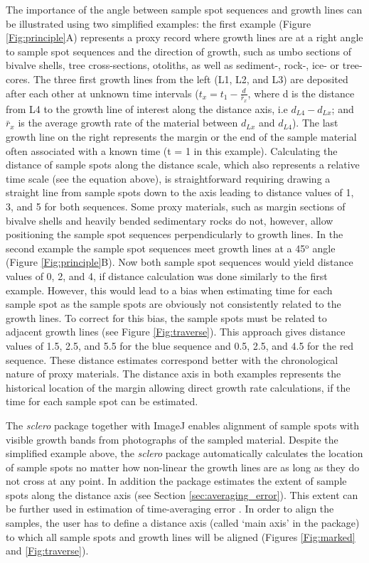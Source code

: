 \documentclass[11pt, a4paper]{article}
\newcommand{\sclero}{\textit{sclero}\xspace}
\begin{document}
The importance of the angle between sample spot sequences and growth lines can be illustrated using two simplified examples: the first example (Figure \ref{Fig:principle}A) represents a proxy record where growth lines are at a right angle to sample spot sequences and the direction of growth, such as umbo sections of bivalve shells, tree cross-sections, otoliths, as well as sediment-, rock-, ice- or tree-cores. The three first growth lines from the left (L1, L2, and L3) are deposited after each other at unknown time intervals ($t_{x} = t_{1} - \frac{d}{\bar{r}_{x}}$, where d is the distance from L4 to the growth line of interest along the distance axis, i.e $d_{L4} - d_{Lx}$; and $\bar{r}_{x}$ is the average growth rate of the material between $d_{Lx}$ and $d_{L4}$). The last growth line on the right represents the margin or the end of the sample material often associated with a known time (t = 1 in this example). Calculating the distance of sample spots along the distance scale, which also represents a relative time scale (see the equation above), is straightforward requiring drawing a straight line from sample spots down to the axis leading to distance values of 1, 3, and 5 for both sequences. Some proxy materials, such as margin sections of bivalve shells and heavily bended sedimentary rocks do not, however, allow positioning the sample spot sequences perpendicularly to growth lines. In the second example the sample spot sequences meet growth lines at a 45$^\mathrm{o}$ angle (Figure \ref{Fig:principle}B). Now both sample spot sequences would yield distance values of 0, 2, and 4, if distance calculation was done similarly to the first example. However, this would lead to a bias when estimating time for each sample spot as the sample spots are obviously not consistently related to the growth lines. To correct for this bias, the sample spots must be related to adjacent growth lines (see Figure \ref{Fig:traverse}). This approach gives distance values of 1.5, 2.5, and 5.5 for the blue sequence and 0.5, 2.5, and 4.5 for the red sequence. These distance estimates correspond better with the chronological nature of proxy materials. The distance axis in both examples represents the historical location of the margin allowing direct growth rate calculations, if the time for each sample spot can be estimated.

The \sclero package together with ImageJ enables alignment of sample spots with visible growth bands from photographs of the sampled material. Despite the simplified example above, the \sclero package automatically calculates the location of sample spots no matter how non-linear the growth lines are as long as they do not cross at any point. In addition the package estimates the extent of sample spots along the distance axis (see Section \ref{sec:averaging_error}). This extent can be further used in estimation of time-averaging error \citep{Goodwin2004, Beelaerts2008}. In order to align the samples, the user has to define a distance axis (called `main axis' in the package) to which all sample spots and growth lines will be aligned (Figures \ref{Fig:marked} and \ref{Fig:traverse}).
\end{document}
